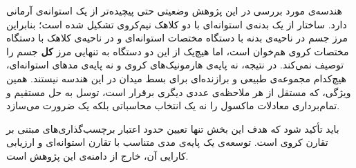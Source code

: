 هندسه‌ی مورد بررسی در این پژوهش وضعیتی حتی پیچیده‌تر از یک استوانه‌ی
آرمانی دارد. ساختار از یک بدنه‌ی استوانه‌ای با دو کلاهک نیم‌کروی تشکیل شده
است؛ بنابراین مرز جسم در ناحیه‌ی بدنه با دستگاه مختصات استوانه‌ای و در
ناحیه‌ی کلاهک با دستگاه مختصات کروی هم‌خوان است، اما هیچ‌یک از این دو
دستگاه به تنهایی مرز \textbf{کل} جسم را توصیف نمی‌کند. در نتیجه، نه پایه‌ی
هارمونیک‌های کروی و نه پایه‌ی مدهای استوانه‌ای، هیچ‌کدام مجموعه‌ی طبیعی و
برازنده‌ای برای بسط میدان در این هندسه نیستند. همین ویژگی، که مستقل از هر
ملاحظه‌ی عددی دیگری برقرار است، توسل به حل مستقیم و تمام‌برداری معادلات
ماکسول را نه یک انتخاب محاسباتی بلکه یک ضرورت می‌سازد.

باید تأکید شود که هدف این بخش تنها تعیین حدود اعتبار برچسب‌گذاری‌های مبتنی
بر تقارن کروی است. توسعه‌ی یک پایه‌ی مدی متناسب با تقارن استوانه‌ای و
ارزیابی کارایی آن، خارج از دامنه‌ی این پژوهش است.
